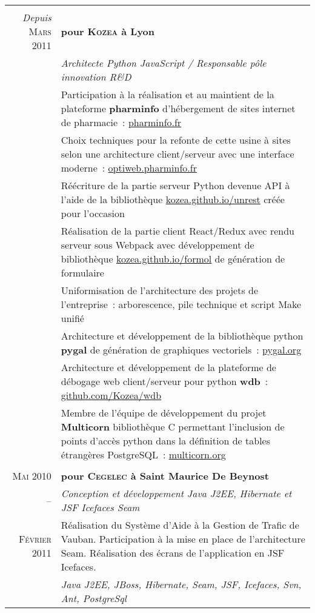 \documentclass[a4paper,10pt]{article}
\begin{document}
\begin{supertabular}{r|p{11cm}}
   \\
  \emph{Depuis} \textsc{Mars} 2011  & \textbf{pour \textsc{Kozea} à Lyon} \\
  & \emph{Architecte Python JavaScript / Responsable pôle innovation R\&D} \\
  & \footnotesize{Participation à la réalisation et au maintient de la plateforme \textbf{pharminfo} d’hébergement de sites internet de pharmacie : \href{https://www.pharminfo.fr}{pharminfo.fr}} \\
  & \footnotesize{Choix techniques pour la refonte de cette usine à sites selon une architecture client/serveur avec une interface moderne : \href{https://optiweb.pharminfo.fr}{optiweb.pharminfo.fr}} \\
  & \footnotesize{Réécriture de la partie serveur Python devenue API à l’aide de la bibliothèque \href{https://kozea.github.io/unrest/}{kozea.github.io/unrest} créée pour l’occasion} \\
  & \footnotesize{Réalisation de la partie client React/Redux avec rendu serveur sous Webpack avec développement de bibliothèque \href{https://kozea.github.io/formol/}{kozea.github.io/formol} de génération de formulaire} \\
  & \footnotesize{Uniformisation de l’architecture des projets de l’entreprise : arborescence, pile technique et script Make unifié} \\
  & \footnotesize{Architecture et développement de la bibliothèque python \textbf{pygal} de génération de graphiques vectoriels : \href{http://www.pygal.org/en/stable/}{pygal.org}} \\
  & \footnotesize{Architecture et développement de la plateforme de débogage web client/serveur pour python \textbf{wdb} : \href{https://github.com/Kozea/wdb}{github.com/Kozea/wdb}} \\
  & \footnotesize{Membre de l’équipe de développement du projet \textbf{Multicorn} bibliothèque C permettant l’inclusion de points d'accès python dans la définition de tables étrangères PostgreSQL : \href{https://multicorn.org/}{multicorn.org}} \\


   \\
  \textsc{Mai} 2010  & \textbf{pour \textsc{Cegelec} à Saint Maurice De Beynost} \\
  -- & \emph{Conception et développement Java J2EE, Hibernate et JSF Icefaces Seam} \\
  \footnotesize{\textsc{Février} 2011} & \footnotesize{Réalisation du Système d’Aide à la Gestion de Trafic de Vauban. Participation à la mise en place de l’architecture Seam. Réalisation des écrans de l’application en JSF Icefaces.} \\
  & \emph{Java J2EE, JBoss, Hibernate, Seam, JSF, Icefaces, Svn, Ant, PostgreSql} \\



\end{supertabular}
\end{document}
